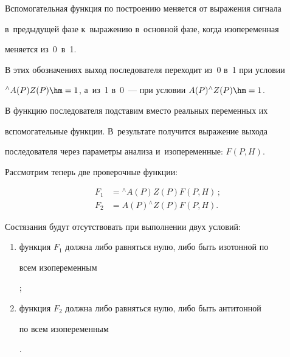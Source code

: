    


   Вспомогательная функция по построению меняется от выражения сигнала 


в~предыдущей фазе к~выражению в~основной фазе, когда изопеременная 


меняется из~0~в~1.


   


   В этих обозначениях выход последователя переходит из~0 в~1 при условии 


${}^{\wedge}A (P) Z (P) \hm= 1$, а~из~1 в~0~--- при условии $A (P) {}^{\wedge}Z (P) 


\hm= 1$.


   


   В функцию последователя подставим вместо реальных переменных их 


вспомогательные функции. В~результате получится выражение выхода 


последователя через параметры анализа и~изопеременные: $F (P, H)$.


   


   Рассмотрим теперь две проверочные функции:


   \begin{align*}


   F_1& = {}^{\wedge}A (P) Z (P) F (P, H)\,;\\


   F_2 &= A (P) {}^{\wedge}Z (P) F (P, H).


   \end{align*}


   


   Состязания будут отсутствовать при выполнении двух условий:


   \begin{enumerate}[(1)]


\item     {функция $F_1$ должна либо равняться нулю, либо быть изотонной по 


всем изопеременным};


   


\item     {функция $F_2$ должна либо равняться нулю, либо быть антитонной 


по всем изопеременным}.


\end{enumerate}





